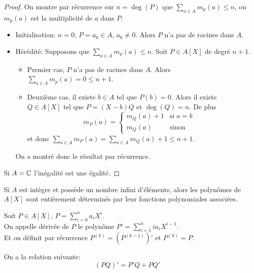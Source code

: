 \begin{proof}
	On montre par récurrence sur $n = \deg(P)$ que $\sum\limits_{a \in A} m_p(a) \leq n$, ou $m_p(a)$ est la multiplicité de $a$ dans $P$.

	\begin{itemize}
		\item Initialisation: $n = 0$, $P = a_0 \in A$, $a_0 \neq 0$.
		      Alors $P$ n'a pas de racines dans $A$.
		\item Hérédité: Supposons que $\sum\limits_{a \in A} m_p(a) \leq n$. Soit $P \in A[X]$ de degré $n+1$.
		      \begin{itemize}
			      \item Premier cas, $P$ n'a pas de racines dans $A$.
			            Alors $\sum\limits_{a \in A} m_p(a) = 0 \leq n+1$.
			      \item Deuxième cas, il existe $b \in A$ tel que $P(b) = 0$.
			            Alors il existe $Q \in A[X]$ tel que $P = (X-b)Q$
			            et $\deg(Q) = n$. De plus
			            $$ m_P(a) = \left\{ \begin{array}{ll}
					            m_Q(a) + 1 & \text{si } a = b \\
					            m_Q(a)     & \text{sinon}
				            \end{array} \right. $$
			            et donc $\sum\limits_{a \in A} m_P(a) = \sum\limits_{a \in A} m_Q(a) + 1 \leq n+1$.
		      \end{itemize}

		      On a montré donc le résultat par récurrence.
	\end{itemize}

	Si $A = \mathbb{C}$ l'inégalité est une égalité.
\end{proof}

\begin{coro}
	Si $A$ est intègre et possède un nombre infini d'éléments, alors les polynômes de $A[X]$ sont entièrement déterminés par leur fonctions polynomiales associées.
\end{coro}

\begin{definition}
	Soit $P \in A[X]$, $P = \sum\limits_{i=0}^n a_iX^i$. \\
	On appelle dérivée de $P$ le polynôme $P' = \sum\limits_{i=1}^n ia_iX^{i-1}$.\\
	Et on définit par récurrence $P^{(k)} = (P^{(k-1)})'$ et $P^{(0)} = P$.
\end{definition}

\begin{prop}
	On a la relation suivante:
	$$ (PQ)' = P'Q + PQ' $$
\end{prop}

